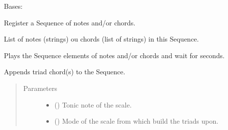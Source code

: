 \documentclass[letterpaper,10pt,english]{sphinxmanual}
\begin{document}
\begin{fulllineitems}
\label{\detokenize{birdears:birdears.sequence.Sequence}}
Bases: 

Register a Sequence of notes and/or chords.

\begin{fulllineitems}
\label{\detokenize{birdears:birdears.sequence.Sequence.elements}}
 \textendash{} List of notes (strings) ou chords (list of
strings) in this Sequence.

\end{fulllineitems}


\begin{fulllineitems}
\label{\detokenize{birdears:birdears.sequence.Sequence.async_play}}
Plays the Sequence elements of notes and/or chords and wait for
 seconds.

\end{fulllineitems}


\begin{fulllineitems}
\label{\detokenize{birdears:birdears.sequence.Sequence.make_chord_progression}}
Appends triad chord(s) to the Sequence.
\begin{quote}\begin{description}
\item[{Parameters}] \leavevmode\begin{itemize}
\item {} 
 () \textendash{} Tonic note of the scale.

\item {} 
 () \textendash{} Mode of the scale from which build the triads upon.


\end{itemize}
\end{description}
\end{quote}
\end{fulllineitems}
\end{fulllineitems}
\end{document}
